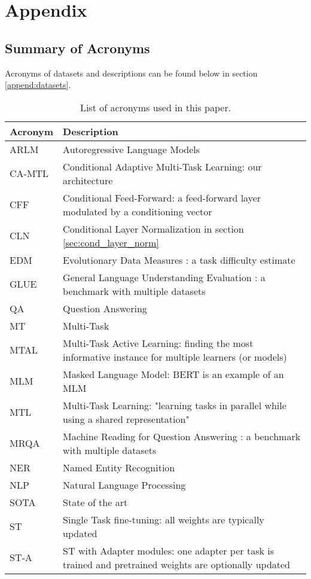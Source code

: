 \documentclass{article} \usepackage{iclr2021_conference,times}
\begin{document}
\clearpage

\appendix

\section{Appendix}

\subsection{Summary of Acronyms}
\label{append:acronyms}

Acronyms of datasets and descriptions can be found below in section \ref{append:datasets}.

\begin{table}[ht]
\caption{\small List of acronyms used in this paper.}
\begin{center}
\scriptsize
\begin{tabular}{|l|l|}
	\hline 
		\textbf{Acronym}   & \textbf{Description} \\
		\hline
		ARLM      & Autoregressive Language Models \\
		CA-MTL    & Conditional Adaptive Multi-Task Learning: our architecture \\
		CFF       & Conditional Feed-Forward: a feed-forward layer modulated by a conditioning vector \\
		CLN       & Conditional Layer Normalization in section \ref{sec:cond_layer_norm} \\
		EDM       & Evolutionary  Data  Measures \citep{collins-etal-2018-evolutionary}: a task difficulty estimate \\
		GLUE      & General Language Understanding Evaluation \cite{wang-etal-2018-glue}: a benchmark with multiple datasets \\
		QA        & Question Answering \\
		MT        & Multi-Task \\
		MTAL      & Multi-Task Active Learning: finding the most informative instance for multiple learners (or models) \\
		MLM       & Masked Language Model: BERT \cite{bert} is an example of an MLM \\
		MTL       & Multi-Task Learning: "learning tasks in parallel while using a shared representation" \citep{mtl_caruana1997} \\
		MRQA      & Machine Reading for Question Answering \cite{fisch2019mrqa}: a benchmark 
		with multiple datasets  \\
		NER       & Named Entity Recognition \\
		NLP       & Natural Language Processing \\
		SOTA      & State of the art \\
		ST        & Single Task fine-tuning: all weights are typically updated  \\
		ST-A      & ST with Adapter modules: one adapter per task is trained and pretrained weights are optionally updated \\
		

\end{tabular}
\end{center}
\end{table}
\end{document}
